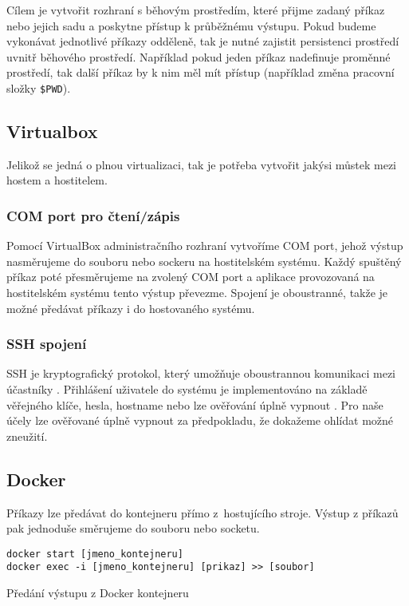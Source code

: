 Cílem je vytvořit rozhraní s běhovým prostředím, které přijme zadaný příkaz nebo jejich sadu a poskytne přístup k průběžnému výstupu.
Pokud budeme vykonávat jednotlivé příkazy odděleně, tak je nutné zajistit persistenci prostředí uvnitř běhového prostředí.
Například pokud jeden příkaz nadefinuje proměnné prostředí, tak další příkaz by k nim měl mít přístup (například změna pracovní složky \verb|$PWD|).

\subsection{Virtualbox}

Jelikož se jedná o plnou virtualizaci, tak je potřeba vytvořit jakýsi můstek mezi hostem a hostitelem.

\subsubsection{COM port pro čtení/zápis}

Pomocí VirtualBox administračního rozhraní vytvoříme COM port, jehož výstup nasměrujeme do souboru nebo sockeru na hostitelském systému.
Každý spuštěný příkaz poté přesměrujeme na zvolený COM port a aplikace provozovaná na hostitelském systému tento výstup převezme.
Spojení je oboustranné, takže je možné předávat příkazy i do hostovaného systému.
\cite{virtualbox_serial}

\subsubsection{SSH spojení}

SSH je kryptografický protokol, který umožňuje oboustrannou komunikaci mezi účastníky \cite{ssh_rfc}.
Přihlášení uživatele do systému je implementováno na základě věřejného klíče, hesla, hostname nebo lze ověřování úplně vypnout \cite{ssh_auth_rfc}.
Pro naše účely lze ověřované úplně vypnout za předpokladu, že dokažeme ohlídat možné zneužití.

\subsection{Docker}

Příkazy lze předávat do kontejneru přímo z~hostujícího stroje.
Výstup z příkazů pak jednoduše směrujeme do souboru nebo socketu.

\begin{listing}[ht]
\begin{verbatim}
docker start [jmeno_kontejneru]
docker exec -i [jmeno_kontejneru] [prikaz] >> [soubor]
\end{verbatim}
\caption{Předání výstupu z Docker kontejneru}
\end{listing}

